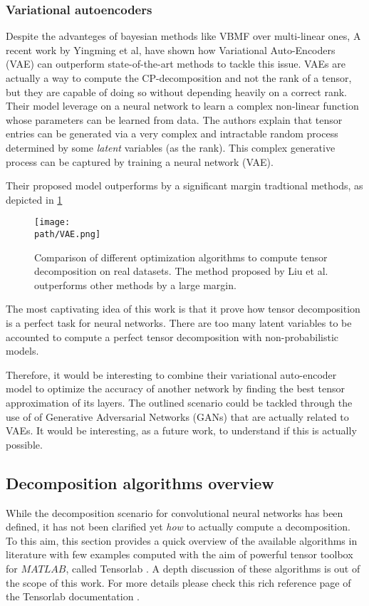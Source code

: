 \subsubsection{Variational autoencoders}
Despite the advanteges of bayesian methods like VBMF over multi-linear ones, 
A recent work by Yingming et al, \parencite{VAE} have shown how Variational Auto-Encoders (VAE) can outperform state-of-the-art methods to tackle this issue. VAEs are actually a way to compute the CP-decomposition and not the rank of a tensor, but they are capable of doing so without depending heavily on a correct rank. \\
Their model leverage on a neural network to learn a complex non-linear function whose parameters can be learned from data. The authors explain that tensor entries can be generated via a very complex and intractable random process determined by some \emph{latent} variables (as the rank). This complex generative process can be captured by training a neural network (VAE). 

Their proposed model outperforms by a significant margin tradtional methods, as depicted in \ref{fig:VAE}

\begin{figure}[h!]
 \centering
 \texttt{[image: \\path/VAE.png]} 
 \caption{Comparison of different optimization algorithms to compute tensor decomposition on real datasets. The method proposed by Liu et al. outperforms other methods by a large margin.}
 \label{fig:VAE}
\end{figure} 

The most captivating idea of this work is that it prove how tensor decomposition is a perfect task for neural networks. There are too many latent variables to be accounted to compute a perfect tensor decomposition with non-probabilistic models. 

Therefore, it would be interesting to combine their variational auto-encoder model to optimize the accuracy of another network by finding the best tensor approximation of its layers. The outlined scenario could be tackled through the use of of Generative Adversarial Networks (GANs)\parencite{GAN} that are actually related to VAEs. It would be interesting, as a future work, to understand if this is actually possible. 


\subsection{Decomposition algorithms overview}
While the decomposition scenario for convolutional neural networks has been defined, it has not been clarified yet \emph{how} to actually compute a decomposition. To this aim, this section provides a quick overview of the available algorithms in literature with few examples computed with the aim of powerful tensor toolbox for $MATLAB$, called Tensorlab \parencite{WTensorlab}. \newline
A depth discussion of these algorithms is out of the scope of this work. For more details please check this rich reference page of the Tensorlab documentation \parencite{WTensorlab-ref}.

